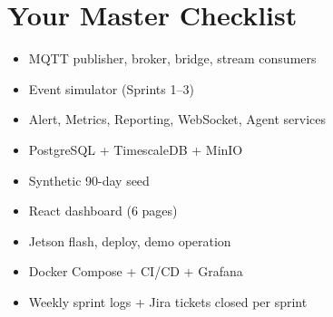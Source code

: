 \documentclass[12pt,a4paper]{article}
\begin{document}
\section{Your Master Checklist}

\begin{itemize}
    \item[$\square$] MQTT publisher, broker, bridge, stream consumers
    \item[$\square$] Event simulator (Sprints 1--3)
    \item[$\square$] Alert, Metrics, Reporting, WebSocket, Agent services
    \item[$\square$] PostgreSQL + TimescaleDB + MinIO
    \item[$\square$] Synthetic 90-day seed
    \item[$\square$] React dashboard (6 pages)
    \item[$\square$] Jetson flash, deploy, demo operation
    \item[$\square$] Docker Compose + CI/CD + Grafana
    \item[$\square$] Weekly sprint logs + Jira tickets closed per sprint
\end{itemize}
\end{document}
